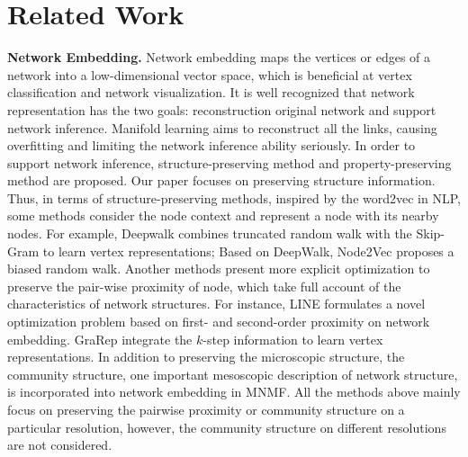 \documentclass{article}
\theoremstyle{definition}
\begin{document}
\section{Related Work}
	\textbf{Network Embedding.} Network embedding maps the vertices or edges of a network into a low-dimensional vector space, which is beneficial at vertex classification and network visualization. 
	It is well recognized that network representation has the two goals: reconstruction original network and support network inference. Manifold learning aims to reconstruct all the links, causing overfitting and limiting the network inference ability seriously\cite{Tenenbaum2000A}\cite{Roweis2000Nonlinear}.
	In order to support network inference, structure-preserving method and property-preserving method are proposed. Our paper focuses on preserving structure information. Thus, in terms of structure-preserving methods, inspired by the word2vec in NLP\cite{mikolov2013efficient}, some methods consider the node context and represent a node with its nearby nodes. 
	For example, Deepwalk \cite{Perozzi2014DeepWalk} 
	combines truncated random walk \cite{fouss2007random-walk} with the Skip-Gram \cite{mikolov2013efficient} to learn vertex representations; 
	Based on DeepWalk, Node2Vec \cite{Grover2016node2vec} proposes a biased random walk.
	Another methods present more explicit optimization to preserve the pair-wise proximity of node, which take full account of the characteristics of network structures. For instance, LINE \cite{Tang2015LINE} formulates a novel optimization problem based on first- and second-order proximity on network embedding. GraRep \cite{Cao2015GraRep} integrate the $k$-step information to learn vertex representations.
	In addition to preserving the microscopic structure, the community structure, one important mesoscopic description of network structure, is incorporated into network embedding in MNMF\cite{Wang2017Community}.
	All the methods above mainly focus on preserving the pairwise proximity or community structure on a particular resolution, however, the community structure on different resolutions are not considered.
\end{document}
